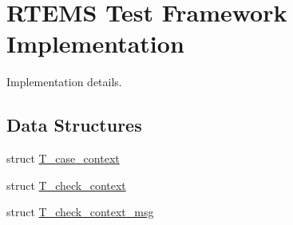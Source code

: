 \hypertarget{group__RTEMSTestFrameworkImpl}{}\section{R\+T\+E\+MS Test Framework Implementation}
\label{group__RTEMSTestFrameworkImpl}


Implementation details.  


\subsection*{Data Structures}
\begin{DoxyCompactItemize}
\item 
struct \mbox{\hyperlink{structT__case__context}{T\+\_\+case\+\_\+context}}
\item 
struct \mbox{\hyperlink{structT__check__context}{T\+\_\+check\+\_\+context}}
\item 
struct \mbox{\hyperlink{structT__check__context__msg}{T\+\_\+check\+\_\+context\+\_\+msg}}
\end{DoxyCompactItemize}
